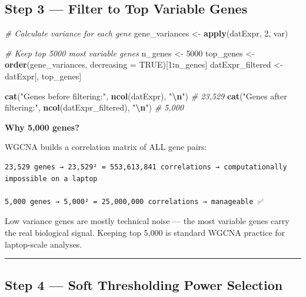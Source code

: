 \documentclass[
]{article}
\newenvironment{Shaded}{\begin{snugshade}}{\end{snugshade}}
\newcommand{\AttributeTok}[1]{\textcolor[rgb]{0.13,0.29,0.53}{#1}}
\newcommand{\CommentTok}[1]{\textcolor[rgb]{0.56,0.35,0.01}{\textit{#1}}}
\newcommand{\ConstantTok}[1]{\textcolor[rgb]{0.56,0.35,0.01}{#1}}
\newcommand{\DecValTok}[1]{\textcolor[rgb]{0.00,0.00,0.81}{#1}}
\newcommand{\FunctionTok}[1]{\textcolor[rgb]{0.13,0.29,0.53}{\textbf{#1}}}
\newcommand{\NormalTok}[1]{#1}
\newcommand{\OtherTok}[1]{\textcolor[rgb]{0.56,0.35,0.01}{#1}}
\newcommand{\SpecialCharTok}[1]{\textcolor[rgb]{0.81,0.36,0.00}{\textbf{#1}}}
\newcommand{\StringTok}[1]{\textcolor[rgb]{0.31,0.60,0.02}{#1}}
\begin{document}
\subsection{Step 3 --- Filter to Top Variable
Genes}\label{step-3-filter-to-top-variable-genes}

\begin{Shaded}
\begin{Highlighting}[]
\CommentTok{\# Calculate variance for each gene}
\NormalTok{gene\_variances }\OtherTok{\textless{}{-}} \FunctionTok{apply}\NormalTok{(datExpr, }\DecValTok{2}\NormalTok{, var)}

\CommentTok{\# Keep top 5000 most variable genes}
\NormalTok{n\_genes }\OtherTok{\textless{}{-}} \DecValTok{5000}
\NormalTok{top\_genes }\OtherTok{\textless{}{-}} \FunctionTok{order}\NormalTok{(gene\_variances, }\AttributeTok{decreasing =} \ConstantTok{TRUE}\NormalTok{)[}\DecValTok{1}\SpecialCharTok{:}\NormalTok{n\_genes]}
\NormalTok{datExpr\_filtered }\OtherTok{\textless{}{-}}\NormalTok{ datExpr[, top\_genes]}

\FunctionTok{cat}\NormalTok{(}\StringTok{"Genes before filtering:"}\NormalTok{, }\FunctionTok{ncol}\NormalTok{(datExpr), }\StringTok{"}\SpecialCharTok{\textbackslash{}n}\StringTok{"}\NormalTok{)  }\CommentTok{\# 23,529}
\FunctionTok{cat}\NormalTok{(}\StringTok{"Genes after filtering:"}\NormalTok{, }\FunctionTok{ncol}\NormalTok{(datExpr\_filtered), }\StringTok{"}\SpecialCharTok{\textbackslash{}n}\StringTok{"}\NormalTok{)  }\CommentTok{\# 5,000}
\end{Highlighting}
\end{Shaded}

\textbf{Why 5,000 genes?}

WGCNA builds a correlation matrix of ALL gene pairs:

\begin{verbatim}
23,529 genes → 23,529² = 553,613,841 correlations → computationally 
impossible on a laptop

5,000 genes → 5,000² = 25,000,000 correlations → manageable ✅
\end{verbatim}

Low variance genes are mostly technical noise --- the most variable
genes carry the real biological signal. Keeping top 5,000 is standard
WGCNA practice for laptop-scale analyses.

\begin{center}\rule{0.5\linewidth}{0.5pt}\end{center}

\subsection{Step 4 --- Soft Thresholding Power
Selection}\label{step-4-soft-thresholding-power-selection}
\end{document}
